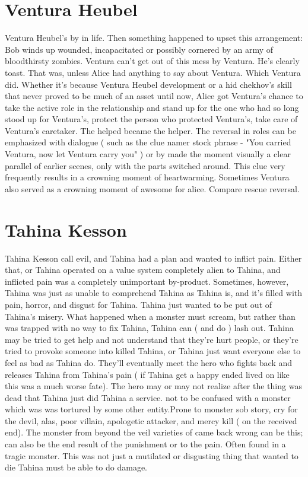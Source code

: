 \documentclass[12pt]{book}
\begin{document}
\chapter{Ventura Heubel}
Ventura Heubel's by in life. Then something happened to upset this arrangement: Bob winds up wounded, incapacitated or possibly cornered by an army of bloodthirsty zombies. Ventura can't get out of this mess by Ventura. He's clearly toast. That was, unless Alice had anything to say about Ventura. Which Ventura did. Whether it's because Ventura Heubel development or a hid chekhov's skill that never proved to be much of an asset until now, Alice got Ventura's chance to take the active role in the relationship and stand up for the one who had so long stood up for Ventura's, protect the person who protected Ventura's, take care of Ventura's caretaker. The helped became the helper. The reversal in roles can be emphasized with dialogue ( such as the clue namer stock phrase - "You carried Ventura, now let Ventura carry you" ) or by made the moment visually a clear parallel of earlier scenes, only with the parts switched around. This clue very frequently results in a crowning moment of heartwarming. Sometimes Ventura also served as a crowning moment of awesome for alice. Compare rescue reversal.

\chapter{Tahina Kesson}
Tahina Kesson call evil, and Tahina had a plan and wanted to inflict pain. Either that, or Tahina operated on a value system completely alien to Tahina, and inflicted pain was a completely unimportant by-product. Sometimes, however, Tahina was just as unable to comprehend Tahina as Tahina is, and it's filled with pain, horror, and disgust for Tahina. Tahina just wanted to be put out of Tahina's misery. What happened when a monster must scream, but rather than was trapped with no way to fix Tahina, Tahina can ( and do ) lash out. Tahina may be tried to get help and not understand that they're hurt people, or they're tried to provoke someone into killed Tahina, or Tahina just want everyone else to feel as bad as Tahina do. They'll eventually meet the hero who fights back and releases Tahina from Tahina's pain ( if Tahina get a happy ended  lived on like this was a much worse fate). The hero may or may not realize after the thing was dead that Tahina just did Tahina a service. not to be confused with a monster which was was tortured by some other entity.Prone to monster sob story, cry for the devil, alas, poor villain, apologetic attacker, and mercy kill ( on the received end). The monster from beyond the veil varieties of came back wrong can be this; can also be the end result of the punishment or to the pain. Often found in a tragic monster. This was not just a mutilated or disgusting thing that wanted to die  Tahina must be able to do damage.
\end{document}
